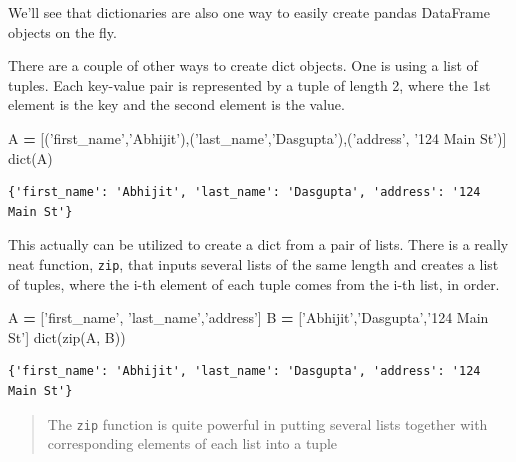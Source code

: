 \documentclass[
  letterpaper,
]{scrbook}
\newenvironment{Shaded}{\begin{snugshade}}{\end{snugshade}}
\newcommand{\BuiltInTok}[1]{#1}
\newcommand{\NormalTok}[1]{#1}
\newcommand{\OperatorTok}[1]{\textcolor[rgb]{0.81,0.36,0.00}{\textbf{#1}}}
\newcommand{\StringTok}[1]{\textcolor[rgb]{0.31,0.60,0.02}{#1}}
\begin{document}
We'll see that dictionaries are also one way to easily create pandas DataFrame objects on the fly.

There are a couple of other ways to create dict objects. One is using a list of tuples. Each key-value pair is represented by a tuple of length 2, where the 1st element is the key and the second element is the value.

\begin{Shaded}
\begin{Highlighting}[]
\NormalTok{A }\OperatorTok{=}\NormalTok{ [(}\StringTok{'first_name'}\NormalTok{,}\StringTok{'Abhijit'}\NormalTok{),(}\StringTok{'last_name'}\NormalTok{,}\StringTok{'Dasgupta'}\NormalTok{),(}\StringTok{'address'}\NormalTok{, }\StringTok{'124 Main St'}\NormalTok{)]}
\BuiltInTok{dict}\NormalTok{(A)}
\end{Highlighting}
\end{Shaded}

\begin{verbatim}
{'first_name': 'Abhijit', 'last_name': 'Dasgupta', 'address': '124 Main St'}
\end{verbatim}

This actually can be utilized to create a dict from a pair of lists. There is a really neat function, \texttt{zip}, that inputs several lists of the same length and creates a list of tuples, where the i-th element of each tuple comes from the i-th list, in order.

\begin{Shaded}
\begin{Highlighting}[]
\NormalTok{A }\OperatorTok{=}\NormalTok{ [}\StringTok{'first_name'}\NormalTok{, }\StringTok{'last_name'}\NormalTok{,}\StringTok{'address'}\NormalTok{]}
\NormalTok{B }\OperatorTok{=}\NormalTok{ [}\StringTok{'Abhijit'}\NormalTok{,}\StringTok{'Dasgupta'}\NormalTok{,}\StringTok{'124 Main St'}\NormalTok{]}
\BuiltInTok{dict}\NormalTok{(}\BuiltInTok{zip}\NormalTok{(A, B))}
\end{Highlighting}
\end{Shaded}

\begin{verbatim}
{'first_name': 'Abhijit', 'last_name': 'Dasgupta', 'address': '124 Main St'}
\end{verbatim}

\begin{quote}
The \texttt{zip} function is quite powerful in putting several lists together with corresponding elements of each list into a tuple
\end{quote}
\end{document}
